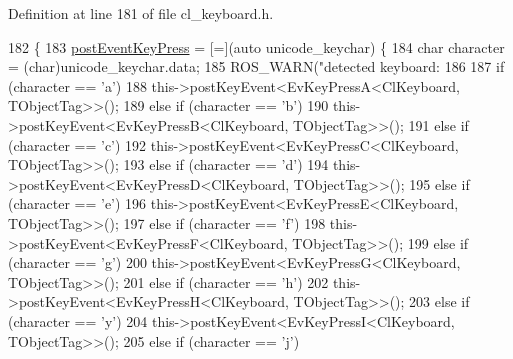 Definition at line 181 of file cl\+\_\+keyboard.\+h.


\begin{DoxyCode}
182         \{
183                 \hyperlink{classsm__three__some_1_1ClKeyboard_a046d6fdc78a670d84714d6adecb12010}{postEventKeyPress} = [=](\textcolor{keyword}{auto} unicode\_keychar) \{
184                         \textcolor{keywordtype}{char} character = (char)unicode\_keychar.data;
185                         ROS\_WARN(\textcolor{stringliteral}{"detected keyboard: %
186 
187                         \textcolor{keywordflow}{if} (character == \textcolor{charliteral}{'a'})
188                                 this->postKeyEvent<EvKeyPressA<ClKeyboard, TObjectTag>>();
189                         \textcolor{keywordflow}{else} \textcolor{keywordflow}{if} (character == \textcolor{charliteral}{'b'})
190                                 this->postKeyEvent<EvKeyPressB<ClKeyboard, TObjectTag>>();
191                         \textcolor{keywordflow}{else} \textcolor{keywordflow}{if} (character == \textcolor{charliteral}{'c'})
192                                 this->postKeyEvent<EvKeyPressC<ClKeyboard, TObjectTag>>();
193                         \textcolor{keywordflow}{else} \textcolor{keywordflow}{if} (character == \textcolor{charliteral}{'d'})
194                                 this->postKeyEvent<EvKeyPressD<ClKeyboard, TObjectTag>>();
195                         \textcolor{keywordflow}{else} \textcolor{keywordflow}{if} (character == \textcolor{charliteral}{'e'})
196                                 this->postKeyEvent<EvKeyPressE<ClKeyboard, TObjectTag>>();
197                         \textcolor{keywordflow}{else} \textcolor{keywordflow}{if} (character == \textcolor{charliteral}{'f'})
198                                 this->postKeyEvent<EvKeyPressF<ClKeyboard, TObjectTag>>();
199                         \textcolor{keywordflow}{else} \textcolor{keywordflow}{if} (character == \textcolor{charliteral}{'g'})
200                                 this->postKeyEvent<EvKeyPressG<ClKeyboard, TObjectTag>>();
201                         \textcolor{keywordflow}{else} \textcolor{keywordflow}{if} (character == \textcolor{charliteral}{'h'})
202                                 this->postKeyEvent<EvKeyPressH<ClKeyboard, TObjectTag>>();
203                         \textcolor{keywordflow}{else} \textcolor{keywordflow}{if} (character == \textcolor{charliteral}{'y'})
204                                 this->postKeyEvent<EvKeyPressI<ClKeyboard, TObjectTag>>();
205                         \textcolor{keywordflow}{else} \textcolor{keywordflow}{if} (character == \textcolor{charliteral}{'j'})
}
\end{DoxyCode}
